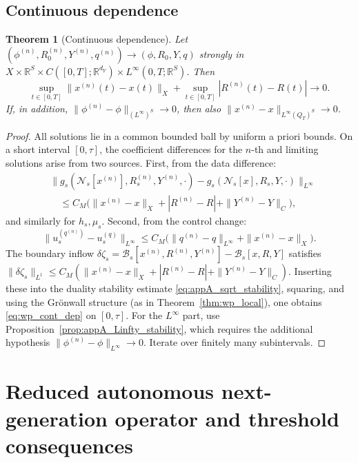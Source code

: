 \documentclass[pdflatex,sn-mathphys-num]{sn-jnl}%
\newtheorem{theorem}{Theorem}[section]
\begin{document}
\subsection{Continuous dependence}
\begin{theorem}[Continuous dependence]\label{thm:wp_continuous_dependence}
Let
\((\phi^{(n)},R_0^{(n)},Y^{(n)},q^{(n)})
\to(\phi,R_0,Y,q)\)
\emph{strongly} in
\(X\times\mathbb R^S\times C([0,T];\mathbb R^{d_Y})\times L^\infty(0,T;\mathbb R^S)\).
Then
\begin{equation}\label{eq:wp_cont_dep}
\sup_{t\in[0,T]}\|x^{(n)}(t)-x(t)\|_X
+\sup_{t\in[0,T]}|R^{(n)}(t)-R(t)|
\longrightarrow 0.
\end{equation}
If, in addition, \(\|\phi^{(n)}-\phi\|_{(L^\infty)^S}\to 0\), then also
\(\|x^{(n)}-x\|_{L^\infty(Q_T)^S}\to 0\).
\end{theorem}
\begin{proof}
All solutions lie in a common bounded ball by uniform a priori bounds. On a short
interval \([0,\tau]\), the coefficient differences for the \(n\)-th and limiting
solutions arise from two sources. First, from the data difference:
\begin{align*}
&\|g_s(\mathcal N_s[x^{(n)}],R_s^{(n)},Y^{(n)},\cdot)
-g_s(\mathcal N_s[x],R_s,Y,\cdot)\|_{L^\infty}\\
&\quad\le
C_M\big(\|x^{(n)}-x\|_X+|R^{(n)}-R|+\|Y^{(n)}-Y\|_C\big),
\end{align*}
and similarly for \(h_s,\mu_s\). Second, from the control change:
\[
\|u_s^{(q^{(n)})}-u_s^{(q)}\|_{L^\infty}
\le C_M\big(\|q^{(n)}-q\|_{L^\infty}+\|x^{(n)}-x\|_X\big).
\]
The boundary inflow \(\delta\zeta_s=\mathcal B_s[x^{(n)},R^{(n)},Y^{(n)}]
-\mathcal B_s[x,R,Y]\) satisfies
\(\|\delta\zeta_s\|_{L^1}\le C_M(\|x^{(n)}-x\|_X+|R^{(n)}-R|+\|Y^{(n)}-Y\|_C)\).
Inserting these into the duality stability estimate \eqref{eq:appA_sqrt_stability},
squaring, and using the Gr\"onwall structure (as in Theorem~\ref{thm:wp_local}), one obtains
\eqref{eq:wp_cont_dep} on \([0,\tau]\). For the \(L^\infty\) part, use
Proposition~\ref{prop:appA_Linfty_stability}, which requires the additional hypothesis
\(\|\phi^{(n)}-\phi\|_{L^\infty}\to 0\). Iterate over finitely many subintervals.
\end{proof}


\section{Reduced autonomous next-generation operator and threshold consequences}%
\label{sec:spectral_R0}
\end{document}
